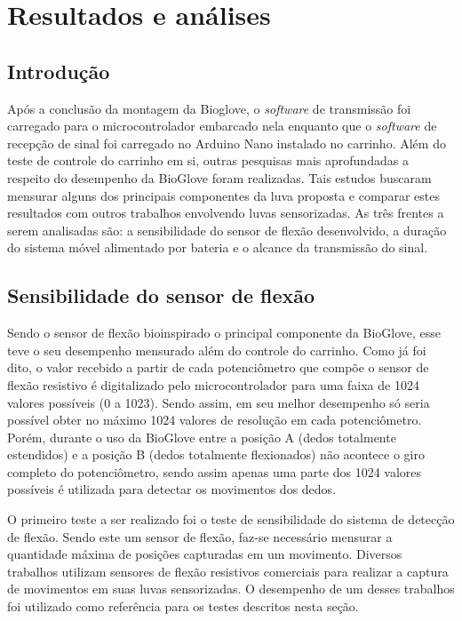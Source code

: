 \documentclass[
	12pt,				%
	openright,			%
	oneside,			%
	a4paper,			%
	english,			%
	brazil				%
	]{abntex2}
\begin{document}


\chapter{Resultados e análises}

		\section{Introdução}
		
		Após a conclusão da montagem da Bioglove, o \textit{software} de transmissão foi carregado para o microcontrolador embarcado nela enquanto que o \textit{software} de recepção de sinal foi carregado no Arduino Nano instalado no carrinho. Além do teste de controle do carrinho em si, outras pesquisas mais aprofundadas a respeito do desempenho da BioGlove foram realizadas. Tais estudos buscaram mensurar alguns dos principais componentes da luva proposta e comparar estes resultados com outros trabalhos envolvendo luvas sensorizadas. As três frentes a serem analisadas são: a sensibilidade do sensor de flexão desenvolvido, a duração do sistema móvel alimentado por bateria e o alcance da transmissão do sinal.
		

		\section{Sensibilidade do sensor de flexão}

		Sendo o sensor de flexão bioinspirado o principal componente da BioGlove, esse teve o seu desempenho mensurado além do controle do carrinho. Como já foi dito, o valor recebido a partir de cada potenciômetro que compõe o sensor de flexão resistivo é digitalizado pelo microcontrolador para uma faixa de 1024 valores possíveis (0 a 1023). Sendo assim, em seu melhor desempenho só seria possível obter no máximo 1024 valores de resolução em cada potenciômetro. Porém, durante o uso da BioGlove entre a posição A (dedos totalmente estendidos) e a posição B (dedos totalmente flexionados) não acontece o giro completo do potenciômetro, sendo assim apenas uma parte dos 1024 valores possíveis é utilizada para detectar os movimentos dos dedos.
		
		O primeiro teste a ser realizado foi o teste de sensibilidade do sistema de detecção de flexão. Sendo este um sensor de flexão, faz-se necessário mensurar a quantidade máxima de posições capturadas em um movimento. Diversos trabalhos utilizam sensores de flexão resistivos comerciais para realizar a captura de movimentos em suas luvas sensorizadas. O desempenho de um desses trabalhos foi utilizado como referência para os testes descritos nesta seção.
\end{document}
